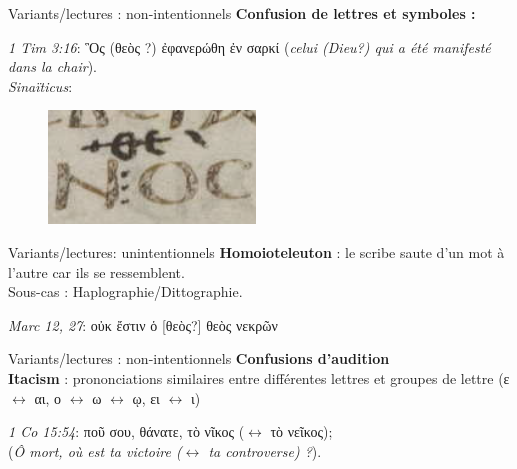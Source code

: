 \documentclass[11pt]{beamer}
\begin{document}
    \begin{frame}{Variants/lectures : non-intentionnels}
\textbf{Confusion de lettres et symboles :}
    \begin{block}{}
        \emph{1 Tim 3:16}:
        \textgreek{ Ὃς (\textgreek{θεὸς ?}) ἐφανερώθη ἐν σαρκί} (\textit{celui (Dieu?) qui a été manifesté dans la chair}).\\
        \textit{Sinaïticus}:
        \begin{figure}
            \centering
            \includegraphics[width=0.3\linewidth]{img/1Tim316.png}
        \end{figure}
    \end{block}
    \end{frame}
    \begin{frame}{Variants/lectures: unintentionnels}
        \textbf{Homoioteleuton} : le scribe saute d'un mot à l'autre car ils se ressemblent. \\
        Sous-cas : Haplographie/Dittographie.\\
        \begin{block}{}
        \emph{Marc 12, 27}: \textgreek{οὐκ ἔστιν ὁ  [θεὸς?] θεὸς νεκρῶν}
        \end{block}

\end{frame}

\begin{frame}{Variants/lectures : non-intentionnels}
\textbf{Confusions d'audition}\\

\textbf{Itacism} : prononciations similaires entre différentes lettres et groupes de lettre (\textgreek{ε} $\leftrightarrow$ \textgreek{αι}, \textgreek{ο} $\leftrightarrow$  \textgreek{ω} $\leftrightarrow$  \textgreek{ῳ}, \textgreek{ει} $\leftrightarrow$ \textgreek{ι})

\begin{block}{}
   \emph{1 Co 15:54}: \textgreek{ποῦ σου, θάνατε, τὸ νῖκος ($\leftrightarrow$ τὸ νεῖκος);} \\
   (\textit{Ô mort, où est ta victoire ($\leftrightarrow$ ta controverse) ?}).
\end{block}
    
\end{frame}
\end{document}
